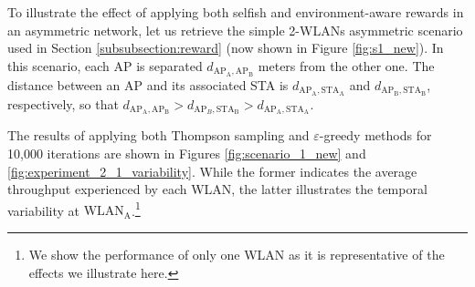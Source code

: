 \documentclass[preprint,12pt]{elsarticle}
\begin{document}
To illustrate the effect of applying both selfish and environment-aware rewards in an asymmetric network, let us retrieve the simple 2-WLANs asymmetric scenario used in Section \ref{subsubsection:reward} (now shown in Figure \ref{fig:s1_new}). In this scenario, each AP is separated $d_{\text{AP}_\text{A},\text{AP}_\text{B}}$ meters from the other one. The distance between an AP and its associated STA is $d_{\text{AP}_\text{A},\text{STA}_\text{A}}$ and $d_{\text{AP}_\text{B},\text{STA}_\text{B}}$, respectively, so that $d_{\text{AP}_\text{A},\text{AP}_\text{B}} > d_{\text{AP}_B,\text{STA}_\text{B}} > d_{\text{AP}_\text{A},\text{STA}_\text{A}}$. 

The results of applying both Thompson sampling and $\varepsilon$-greedy methods for 10,000 iterations are shown in Figures \ref{fig:scenario_1_new} and \ref{fig:experiment_2_1_variability}. While the former indicates the average throughput experienced by each WLAN, the latter illustrates the temporal variability at $\text{WLAN}_\text{A}$.\footnote{We show the performance of only one WLAN as it is representative of the effects we illustrate here.}
\end{document}
